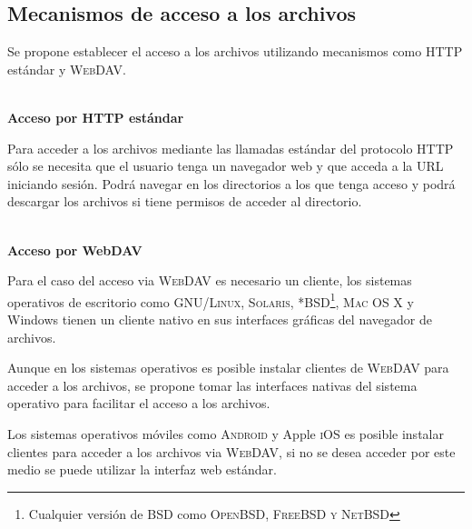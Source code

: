       \subsection {Mecanismos de acceso a los archivos}

Se propone establecer el acceso a los archivos utilizando mecanismos como \textsc{HTTP} est\'{a}ndar y \textsc{WebDAV}.


          \textbf{\\ Acceso por HTTP est\'{a}ndar \\}

Para acceder a los archivos mediante las llamadas est\'{a}ndar del protocolo HTTP s\'{o}lo se necesita que el usuario tenga un navegador web y que acceda a la \textsc{URL} iniciando sesi\'{o}n. Podr\'{a} navegar en los directorios a los que tenga acceso y podr\'{a} descargar los archivos si tiene permisos de acceder al directorio.

          \textbf{\\ Acceso por WebDAV \\}

Para el caso del acceso via \textsc{WebDAV} es necesario un cliente, los sistemas operativos de escritorio como \textsc{GNU/Linux}, \textsc{Solaris}, \textsc{*BSD\footnote{Cualquier versi\'{o}n de BSD como \textsc{OpenBSD, FreeBSD y NetBSD}}}, \textsc{Mac OS X} y Windows tienen un cliente nativo en sus interfaces gr\'{a}ficas del navegador de archivos.

Aunque en los sistemas operativos es posible instalar clientes de \textsc{WebDAV} para acceder a los archivos, se propone tomar las interfaces nativas del sistema operativo para facilitar el acceso a los archivos.

Los sistemas operativos m\'{o}viles como \textsc{Android} y Apple \textsc{iOS} es posible instalar clientes para acceder a los archivos via \textsc{WebDAV}, si no se desea acceder por este medio se puede utilizar la interfaz web est\'{a}ndar.


